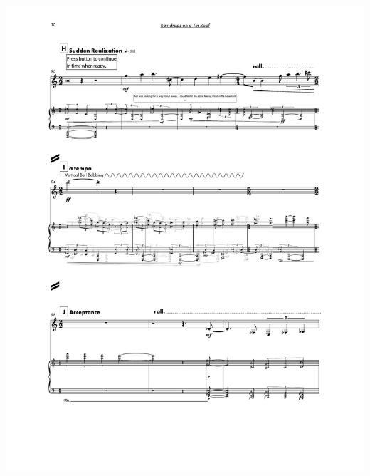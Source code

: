 \begin{center}
     \includegraphics[scale=0.75]{Scores/raindrops_Part16.pdf}
\end{center}
\newpage
